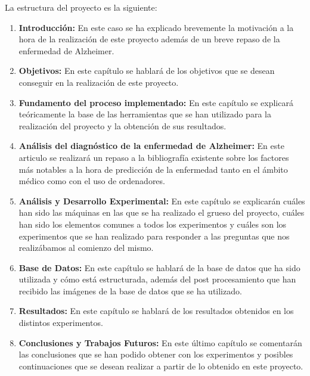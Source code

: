 La estructura del proyecto es la siguiente:
\begin{enumerate}
	\item \textbf{Introducción: }En este caso se ha explicado brevemente la motivación a la hora de la realización de este proyecto además de un breve repaso de la enfermedad de Alzheimer.
	\item \textbf{Objetivos: }En este capítulo se hablará de los objetivos que se desean conseguir en la realización de este proyecto.
	\item \textbf{Fundamento del proceso implementado: }En este capítulo se explicará teóricamente la base de las herramientas que se han utilizado para la realización del proyecto y la obtención de sus resultados.
	\item \textbf{Análisis del diagnóstico de la enfermedad de Alzheimer: } En este articulo se realizará un repaso a la bibliografía existente sobre los factores más notables a la hora de predicción de la enfermedad tanto en el ámbito médico como con el uso de ordenadores. 
	\item \textbf{Análisis y Desarrollo Experimental: }En este capítulo se explicarán cuáles han sido las máquinas en las que se ha realizado el grueso del proyecto, cuáles han sido los elementos comunes a todos los experimentos y cuáles son los experimentos que se han realizado para responder a las preguntas que nos realizábamos al comienzo del mismo.
	\item \textbf{Base de Datos: }En este capítulo se hablará de la base de datos que ha sido utilizada y cómo está estructurada, además del post procesamiento que han recibido las imágenes de la base de datos que se ha utilizado.
	\item \textbf{Resultados: }En este capítulo se hablará de los resultados obtenidos en los distintos experimentos.
	\item \textbf{Conclusiones y Trabajos Futuros: }En este último capítulo se comentarán las conclusiones que se han podido obtener con los experimentos y posibles continuaciones que se desean realizar a partir de lo obtenido en este proyecto.
\end{enumerate}